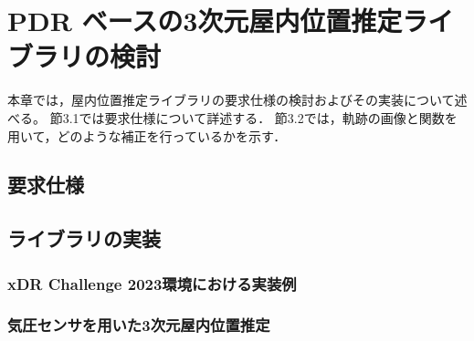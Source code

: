 
\chapter{PDR ベースの3次元屋内位置推定ライブラリの検討}
\thispagestyle{myheadings}
本章では，屋内位置推定ライブラリの要求仕様の検討およびその実装について述べる。
節3.1では要求仕様について詳述する．
節3.2では，軌跡の画像と関数を用いて，どのような補正を行っているかを示す．


\section{要求仕様}






\section{ライブラリの実装}


\subsection{xDR Challenge 2023環境における実装例}









\subsection{気圧センサを用いた3次元屋内位置推定}



















